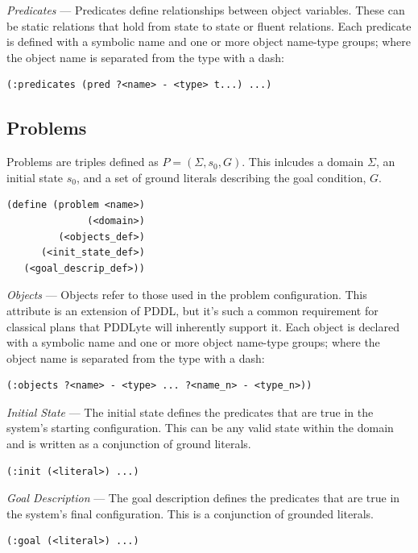 \documentclass[
a4paper, %
11pt, %
onecolumn, %
openany, %
]{memoir}
\begin{document}
{\textit{Predicates} --- Predicates define relationships between object variables. These can be static relations that hold from state to state or fluent relations. Each predicate is defined with a symbolic name and one or more object name-type groups; where the object name is separated from the type with a dash:

\begin{lstlisting}
(:predicates (pred ?<name> - <type> t...) ...)
\end{lstlisting}

\subsection{Problems}
Problems are triples defined as $P = (\Sigma, s_0, G)$. This inlcudes a domain $\Sigma$, an initial state $s_0$, and a set of ground literals describing the goal condition, $G$.

\begin{lstlisting}
(define (problem <name>)
              (<domain>)
         (<objects_def>)
      (<init_state_def>)
   (<goal_descrip_def>))
\end{lstlisting}

\textit{Objects} --- Objects refer to those used in the problem configuration. This attribute is an extension of PDDL, but it's such a common requirement for classical plans that PDDLyte will inherently support it. Each object is declared with a symbolic name and one or more object name-type groups; where the object name is separated from the type with a dash:


\begin{lstlisting}
(:objects ?<name> - <type> ... ?<name_n> - <type_n>))
\end{lstlisting}

\textit{Initial State} --- The initial state defines the predicates that are true in the system's starting configuration. This can be any valid state within the domain and is written as a conjunction of ground literals.

\begin{lstlisting}
(:init (<literal>) ...)
\end{lstlisting}

\textit{Goal Description} --- The goal description defines the predicates that are true in the system's final configuration. This is a conjunction of grounded literals.

\begin{lstlisting}
(:goal (<literal>) ...)
\end{lstlisting}


}
\end{document}
